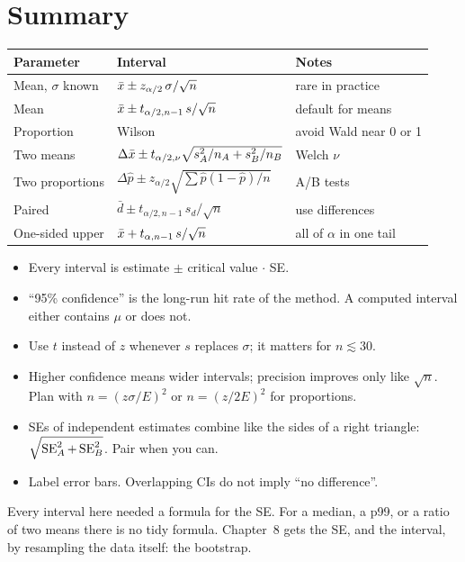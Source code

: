 \section{Summary}
\label{sec:ci-summary}

\begin{center}
\renewcommand{\arraystretch}{1.35}
\begin{tabular}{lll}
\toprule
Parameter & Interval & Notes \\
\midrule
Mean, $\sigma$ known & $\bar{x} \pm z_{\alpha/2}\,\sigma/\sqrt n$ & rare in practice \\
Mean & $\bar{x} \pm t_{\alpha/2,n-1}\,s/\sqrt n$ & default for means \\
Proportion & Wilson & avoid Wald near 0 or 1 \\
Two means & $\Delta\bar{x} \pm t_{\alpha/2,\nu}\sqrt{s_A^2/n_A + s_B^2/n_B}$ & Welch $\nu$ \\
Two proportions & $\Delta\hat p \pm z_{\alpha/2}\sqrt{\sum \hat p(1-\hat p)/n}$ & A/B tests \\
Paired & $\bar d \pm t_{\alpha/2,n-1}\,s_d/\sqrt n$ & use differences \\
One-sided upper & $\bar{x} + t_{\alpha,n-1}\,s/\sqrt n$ & all of $\alpha$ in one tail \\
\bottomrule
\end{tabular}
\end{center}

\begin{itemize}
  \item Every interval is estimate $\pm$ critical value $\cdot$ SE.
  \item ``95\% confidence'' is the long-run hit rate of the method. A computed
        interval either contains $\mu$ or does not.
  \item Use $t$ instead of $z$ whenever $s$ replaces $\sigma$; it matters for
        $n\lesssim 30$.
  \item Higher confidence means wider intervals; precision improves only like
        $\sqrt n$. Plan with $n = (z\sigma/E)^2$ or $n=(z/2E)^2$ for
        proportions.
  \item SEs of independent estimates combine like the sides of a right
        triangle: $\sqrt{\operatorname{SE}_A^2+\operatorname{SE}_B^2}$. Pair when you can.
  \item Label error bars. Overlapping CIs do not imply ``no difference''.
\end{itemize}

Every interval here needed a formula for the SE. For a median, a p99, or a
ratio of two means there is no tidy formula. Chapter~8 gets the SE, and the
interval, by resampling the data itself: the bootstrap.

